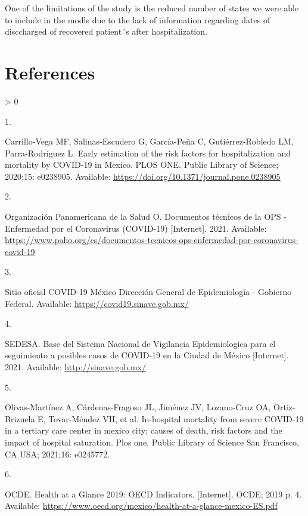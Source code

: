 \documentclass[10pt,letterpaper]{article}
\newlength{\csllabelwidth}
\newlength{\cslhangindent}
\newenvironment{CSLReferences}[3] %
 {%
  \setlength{\parindent}{0pt}
  \ifodd #1 \everypar{\setlength{\hangindent}{\cslhangindent}}\ignorespaces\fi
  \ifnum #2 > 0
  \setlength{\parskip}{#2\baselineskip}
  \fi
 }%
 {}
\newcommand{\CSLLeftMargin}[1]{\parbox[t]{\csllabelwidth}{#1}}
\newcommand{\CSLRightInline}[1]{\parbox[t]{\linewidth - \csllabelwidth}{#1}}
\begin{document}
One of the limitations of the study is the reduced number of states we
were able to include in the modls due to the lack of information
regarding dates of disccharged of recovered patient´s after
hospitalization.

\hypertarget{references}{%
\section*{References}\label{references}}

\hypertarget{refs}{}
\begin{CSLReferences}{0}{0}
\leavevmode\hypertarget{ref-Carrillo-Vega2020}{}%
\CSLLeftMargin{1. }
\CSLRightInline{Carrillo-Vega MF, Salinas-Escudero G, García-Peña C,
Gutiérrez-Robledo LM, Parra-Rodríguez L. {Early estimation of the risk
factors for hospitalization and mortality by COVID-19 in Mexico}. PLOS
ONE. Public Library of Science; 2020;15: e0238905. Available:
\url{https://doi.org/10.1371/journal.pone.0238905}}

\leavevmode\hypertarget{ref-OrganizacionPanamericanadelaSalud2021}{}%
\CSLLeftMargin{2. }
\CSLRightInline{Organización Panamericana de la Salud O. {Documentos
t{é}cnicos de la OPS - Enfermedad por el Coronavirus (COVID-19)}
{[}Internet{]}. 2021. Available:
\url{https://www.paho.org/es/documentos-tecnicos-ops-enfermedad-por-coronavirus-covid-19}}

\leavevmode\hypertarget{ref-covidgob}{}%
\CSLLeftMargin{3. }
\CSLRightInline{Sitio oficial COVID-19 M{é}xico Direcci{ó}n General de
Epidemiolog{í}a - Gobierno Federal. Available:
\url{https://covid19.sinave.gob.mx/}}

\leavevmode\hypertarget{ref-SEDESA2021}{}%
\CSLLeftMargin{4. }
\CSLRightInline{SEDESA. {Base del Sistema Nacional de Vigilancia
Epidemiologica para el seguimiento a posibles casos de COVID-19 en la
Ciudad de M{é}xico} {[}Internet{]}. 2021. Available:
\url{http://sinave.gob.mx/}}

\leavevmode\hypertarget{ref-olivas2021hospital}{}%
\CSLLeftMargin{5. }
\CSLRightInline{Olivas-Martínez A, Cárdenas-Fragoso JL, Jiménez JV,
Lozano-Cruz OA, Ortiz-Brizuela E, Tovar-Méndez VH, et al. In-hospital
mortality from severe COVID-19 in a tertiary care center in mexico city;
causes of death, risk factors and the impact of hospital saturation.
Plos one. Public Library of Science San Francisco, CA USA; 2021;16:
e0245772. }

\leavevmode\hypertarget{ref-OCDE2019}{}%
\CSLLeftMargin{6. }
\CSLRightInline{OCDE. {Health at a Glance 2019: OECD Indicators.}
{[}Internet{]}. OCDE; 2019 p. 4. Available:
\url{https://www.oecd.org/mexico/health-at-a-glance-mexico-ES.pdf}}


\end{CSLReferences}
\end{document}
